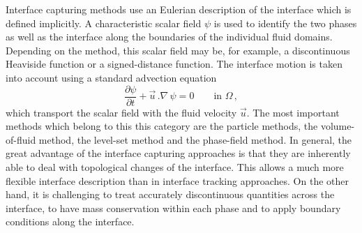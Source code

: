 Interface capturing methods use an Eulerian description of the interface which
is defined implicitly. A characteristic scalar field $\psi$ is used to identify
the two phases as well as the interface along the boundaries of the individual
fluid domains. Depending on the method, this scalar field may be, for example,
a discontinuous Heaviside function or a signed-distance function. The interface
motion is taken into account using a standard advection equation
\begin{equation}
\frac{\partial \psi}{\partial t}+\vec u\,.\nabla\,\psi=0 \qquad \mbox{in }
\Omega\,,
\end{equation}
which transport the scalar field with the fluid velocity $\vec u$. The most
important methods which belong to this this category are the particle methods,
the volume-of-fluid method, the level-set method and the phase-field method. In
general, the great advantage of the interface capturing approaches is that they
are inherently able to deal with topological changes of the interface. This
allows a much more flexible interface description than in interface tracking
approaches. On the other hand, it is challenging to treat accurately
discontinuous quantities across the interface, to have mass conservation
within each phase and to apply boundary conditions along the interface.

